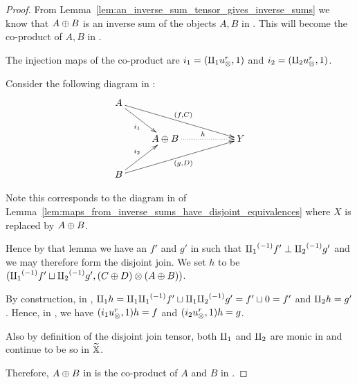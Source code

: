 \begin{proof}
  From Lemma~\ref{lem:an_inverse_sum_tensor_gives_inverse_sums} we know that $A\oplus B$ is an inverse
  sum of the objects $A, B$ in \X. This will become the co-product of $A, B$ in \Xt.

  The injection maps of the co-product are $i_1 =(\amalg_{1} u_{\otimes}^r, 1)$ and $i_2 = (\amalg_{2} u_{\otimes}^r, 1)$.

  Consider the following diagram in \Xt:
  \[
    \xymatrix{
      A \ar[drrr]^{(f,C)} \ar[dr]_{i_1} \\
      & A\+B \ar@{.>}[rr]^h & & Y \\
      B \ar[urrr]_{(g,D)} \ar[ur]^{i_2}
    }
  \]

  Note this corresponds to the diagram in \X of
  Lemma~\ref{lem:maps_from_inverse_sums_have_disjoint_equivalences} where $X$ is replaced by $A\oplus B$.

  Hence by that lemma we have an $f'$ and $g'$ in \X such that ${\amalg_{1}}^{(-1)} f' \perp {\amalg_{2}}^{(-1)} g'$ and
  we may therefore form the disjoint join. We set $h$ to be $({\amalg_{1}}^{(-1)} f' \sqcup {\amalg_{2}}^{(-1)} g',
  (C\oplus D)\otimes(A\oplus B))$.

  By construction, in \X, $\amalg_{1} h = \amalg_{1}{\amalg_{1}}^{(-1)} f' \sqcup \amalg_{1}{\amalg_{2}}^{(-1)} g' = f' \sqcup 0 = f'$ and
  $\amalg_{2} h = g'$. Hence, in \Xt, we have $(i_1 u_{\otimes}^r, 1) h = f$ and $(i_2 u_{\otimes}^r, 1) h = g$.

  Also by definition of the disjoint join tensor, both $\amalg_{1}$ and $\amalg_{2}$ are monic in \X and
  continue to be so in $\widetilde{\mathbb{X}}$.

  Therefore, $A\oplus B$ in \X is the co-product of $A$ and $B$ in \Xt.
\end{proof}


